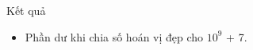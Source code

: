 Kết quả
\begin{itemize}
	\item     Phần dư khi chia số hoán vị đẹp cho $10^{9}$    + 7.   
\end{itemize}